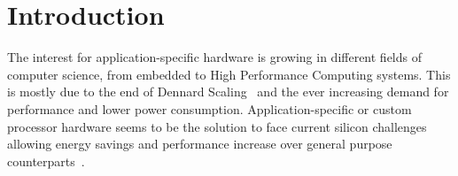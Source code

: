 \section{Introduction}
The interest for application-specific hardware is growing in different fields of computer science, from embedded to High Performance Computing systems. This is mostly due to the end of Dennard Scaling~\cite{esmaeilzadeh2011dark}
and the ever increasing demand for performance and lower power consumption. Application-specific or custom processor hardware seems to be the solution to face current silicon challenges allowing energy savings and performance increase over general purpose counterparts~\cite{hameed2010understanding}.  
%

